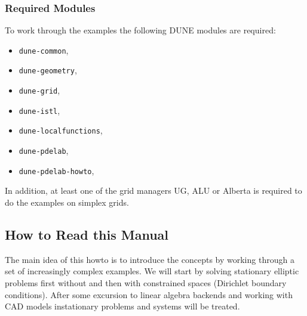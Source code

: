 \begin{frame}
\frametitle<presentation>{Required Modules}
To work through the examples the following DUNE modules are required: 
\begin{itemize}
\item \lstinline{dune-common},
\item \lstinline{dune-geometry},
\item \lstinline{dune-grid},
\item \lstinline{dune-istl},
\item \lstinline{dune-localfunctions},
\item \lstinline{dune-pdelab},
\item \lstinline{dune-pdelab-howto},
\end{itemize}

In addition, at least one of the grid managers UG, ALU or Alberta is
required to do the examples on simplex grids. 
\end{frame}



\subsection{How to Read this Manual}

The main idea of this howto is to introduce the concepts by working
through a set of increasingly complex examples. We will start by 
solving stationary elliptic problems first without and then with constrained spaces
(Dirichlet boundary conditions). After some excursion to linear algebra backends and 
working with CAD models instationary problems and systems will be treated.

\cleardoublepage

